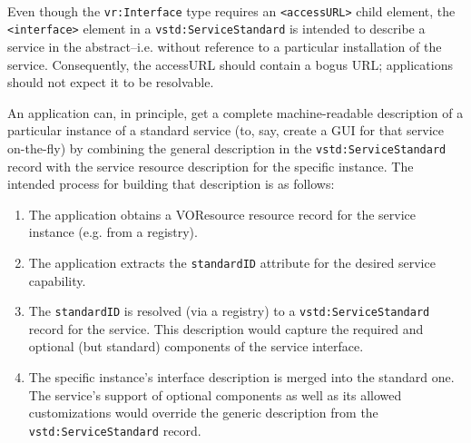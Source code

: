 \documentclass[11pt,a4paper]{ivoa}
\begin{document}
{{\begin{table}
\begin{tabular}[FIXTHIS]
\begin{table}
\begin{tabular}[FIXTHIS]
\end{tabular}
\end{table}
\\

\end{tabular}
\end{table}



Even though the \texttt{vr:Interface} type requires an
\texttt{<accessURL>} child element, 
the \texttt{<interface>} element in a
\texttt{vstd:ServiceStandard} is intended to describe a service in
the abstract--i.e. without reference to a particular installation of the
service.  Consequently, the accessURL should contain a bogus URL;
applications should not expect it to be resolvable.



An application can, in principle, get a complete machine-readable
description of a particular instance of a standard service (to, say,
create a GUI for that service on-the-fly) by combining the general
description in the \texttt{vstd:ServiceStandard} record with the
service resource description for the specific instance.  The intended
process for building that description is as follows:


\begin{enumerate}

\item  The application obtains a VOResource resource record for the
       service instance (e.g. from a registry).  {}

\item  The application extracts the \texttt{standardID} attribute
       for the desired service capability.  {}

\item  The \texttt{standardID} is resolved (via a registry) to a
       \texttt{vstd:ServiceStandard} record for the service.  This
       description would capture the required and optional (but
       standard) components of the service interface.{}

\item  The specific instance's interface description is merged into
       the standard one.  The service's support of optional components
       as well as its allowed customizations would override the
       generic description from the \texttt{vstd:ServiceStandard}
       record.  {}

\end{enumerate}

}}
\end{document}
